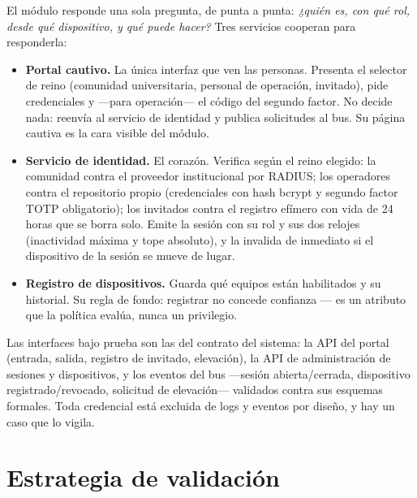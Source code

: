 \documentclass[11pt,a4paper]{article}
\begin{document}
El módulo responde una sola pregunta, de punta a punta: \emph{¿quién es, con qué rol, desde qué dispositivo, y qué puede hacer?} Tres servicios cooperan para responderla:

\begin{itemize}
\item \textbf{Portal cautivo.} La única interfaz que ven las personas. Presenta el selector de reino (comunidad universitaria, personal de operación, invitado), pide credenciales y ---para operación--- el código del segundo factor. No decide nada: reenvía al servicio de identidad y publica solicitudes al bus. Su página cautiva es la cara visible del módulo.
\item \textbf{Servicio de identidad.} El corazón. Verifica según el reino elegido: la comunidad contra el proveedor institucional por RADIUS; los operadores contra el repositorio propio (credenciales con hash bcrypt y segundo factor TOTP obligatorio); los invitados contra el registro efímero con vida de 24 horas que se borra solo. Emite la sesión con su rol y sus dos relojes (inactividad máxima y tope absoluto), y la invalida de inmediato si el dispositivo de la sesión se mueve de lugar.
\item \textbf{Registro de dispositivos.} Guarda qué equipos están habilitados y su historial. Su regla de fondo: registrar no concede confianza --- es un atributo que la política evalúa, nunca un privilegio.
\end{itemize}

Las interfaces bajo prueba son las del contrato del sistema: la API del portal (entrada, salida, registro de invitado, elevación), la API de administración de sesiones y dispositivos, y los eventos del bus ---sesión abierta/cerrada, dispositivo registrado/revocado, solicitud de elevación--- validados contra sus esquemas formales. Toda credencial está excluida de logs y eventos por diseño, y hay un caso que lo vigila.

\section{Estrategia de validación}
\end{document}
